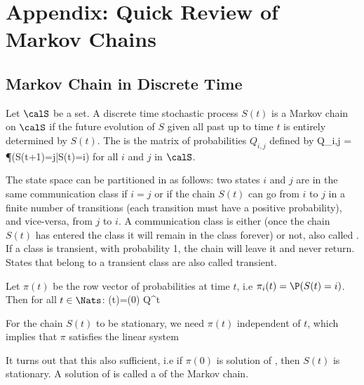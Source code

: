\section{Appendix: Quick Review of Markov Chains}
\label{sec-mcr}
\subsection{Markov Chain in Discrete Time}
\label{sec-distime} Let $\calS$ be a  set. A
discrete time stochastic process $S(t)$ is a Markov chain on
$\calS$ if the future evolution of $S$ given all past up to
time $t$ is entirely determined by $S(t)$. The  is the matrix of probabilities $Q_{i,j}$ defined by
 \be
 Q_{i,j} = \P(S(t+1)=j|S(t)=i)
 \label{eq-palm-tm}
 \ee
for all $i$ and $j$ in $\calS$.

The state space can be partitioned in  as follows: two states $i$ and $j$ are in the same
communication class if $i=j$ or if the chain $S(t)$ can go from
$i$ to $j$ in a finite number of transitions (each transition
must have a positive probability), and vice-versa, from $j$ to
$i$. A communication class is either  (once the
chain $S(t)$ has entered the class it will remain in the class
forever) or not, also called . If a class is
transient, with probability 1, the chain will leave it and
never return. States that belong to a transient class are also
called transient.

Let $\pi(t)$ be the row vector of probabilities at time $t$,
i.e $\pi_i(t)=\P(S(t)=i)$. Then for all $t \in \Nats$:
 \be
\pi(t)=\pi(0) Q^t \label{eq-trans-dis}
 \ee

For the chain $S(t)$ to be stationary, we need $\pi(t)$
independent of $t$, which implies that $\pi$ satisfies the
linear system
 \be
 \label{eq-proba-stat}
 \ee

It turns out that this also sufficient, i.e if $\pi(0)$ is
solution of ,  then $S(t)$ is stationary. A
solution of  is called a  of the Markov chain.

